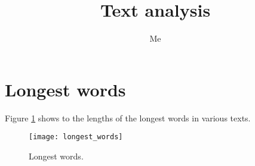 \documentclass[11pt, a4paper, final]{article}
\title{Text analysis}
\author{Me}
\begin{document}
\maketitle

\section{Longest words}

Figure \ref{fig:longest_words} shows to the lengths of the longest words in various texts.

\begin{figure}[htb]
\centering
\texttt{[image: longest\_words]}
\caption{Longest words.}
\label{fig:longest_words}
\end{figure}
\end{document}
